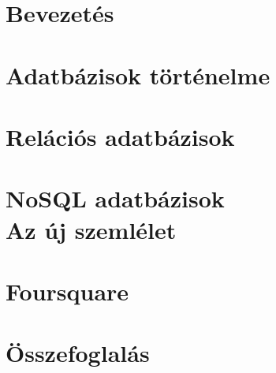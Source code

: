 \documentclass[12pt,a4paper,english,magyar,oneside]{report}
\begin{document}


\setcounter{tocdepth}{2} %
\tableofcontents %
\printnomenclature[2.5cm]
\chapter{Bevezetés}



\chapter{Adatbázisok történelme}


\chapter{Relációs adatbázisok}


\chapter{NoSQL adatbázisok\\\small{Az új szemlélet}}



\chapter{Foursquare}


\chapter{Összefoglalás}


\newpage

\printbibliography


\end{document}

